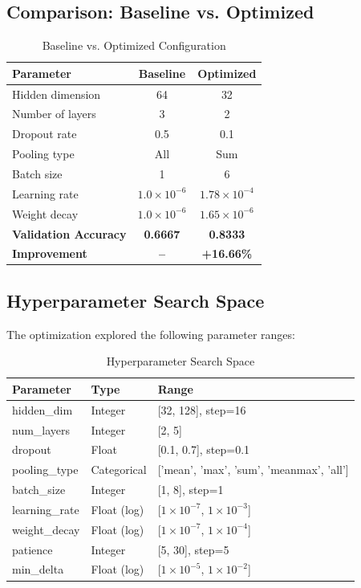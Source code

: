 \documentclass[11pt,a4paper]{article}
\begin{document}
\subsection{Comparison: Baseline vs. Optimized}

\begin{table}[H]
\centering
\caption{Baseline vs. Optimized Configuration}
\begin{tabular}{lcc}
\toprule
\textbf{Parameter} & \textbf{Baseline} & \textbf{Optimized} \\
\midrule
Hidden dimension & 64 & 32 \\
Number of layers & 3 & 2 \\
Dropout rate & 0.5 & 0.1 \\
Pooling type & All & Sum \\
Batch size & 1 & 6 \\
Learning rate & $1.0 \times 10^{-6}$ & $1.78 \times 10^{-4}$ \\
Weight decay & $1.0 \times 10^{-6}$ & $1.65 \times 10^{-6}$ \\
\midrule
\textbf{Validation Accuracy} & \textbf{0.6667} & \textbf{0.8333} \\
\textbf{Improvement} & \textbf{--} & \textbf{+16.66\%} \\
\bottomrule
\end{tabular}
\end{table}

\subsection{Hyperparameter Search Space}

The optimization explored the following parameter ranges:

\begin{table}[H]
\centering
\caption{Hyperparameter Search Space}
\begin{tabular}{lll}
\toprule
\textbf{Parameter} & \textbf{Type} & \textbf{Range} \\
\midrule
hidden\_dim & Integer & [32, 128], step=16 \\
num\_layers & Integer & [2, 5] \\
dropout & Float & [0.1, 0.7], step=0.1 \\
pooling\_type & Categorical & ['mean', 'max', 'sum', 'meanmax', 'all'] \\
batch\_size & Integer & [1, 8], step=1 \\
learning\_rate & Float (log) & [$1 \times 10^{-7}$, $1 \times 10^{-3}$] \\
weight\_decay & Float (log) & [$1 \times 10^{-7}$, $1 \times 10^{-4}$] \\
patience & Integer & [5, 30], step=5 \\
min\_delta & Float (log) & [$1 \times 10^{-5}$, $1 \times 10^{-2}$] \\
\bottomrule
\end{tabular}
\end{table}
\end{document}
